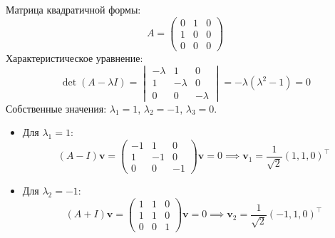\documentclass[a4paper]{article}
\begin{document}
\begin{enumerate}
\begin{enumerate}
    Матрица квадратичной формы:  
    \[
    A = \begin{pmatrix}
    0 & 1 & 0 \\
    1 & 0 & 0 \\
    0 & 0 & 0
    \end{pmatrix}
    \]  
    Характеристическое уравнение:  
    \[
    \det(A - \lambda I) = \begin{vmatrix}
    -\lambda & 1 & 0 \\
    1 & -\lambda & 0 \\
    0 & 0 & -\lambda
    \end{vmatrix} = -\lambda(\lambda^2 - 1) = 0
    \]  
    Собственные значения: \(\lambda_1 = 1\), \(\lambda_2 = -1\), \(\lambda_3 = 0\).  
    \begin{itemize}
      \item Для \(\lambda_1 = 1\):  
      \[
      (A - I)\mathbf{v} = \begin{pmatrix}
      -1 & 1 & 0 \\
      1 & -1 & 0 \\
      0 & 0 & -1
      \end{pmatrix} \mathbf{v} = 0 \implies \mathbf{v}_1 = \frac{1}{\sqrt{2}} (1, 1, 0)^\top
      \]  

      \item Для \(\lambda_2 = -1\):  
      \[
      (A + I)\mathbf{v} = \begin{pmatrix}
      1 & 1 & 0 \\
      1 & 1 & 0 \\
      0 & 0 & 1
      \end{pmatrix} \mathbf{v} = 0 \implies \mathbf{v}_2 = \frac{1}{\sqrt{2}} (-1, 1, 0)^\top
      \]  


\end{itemize}
\end{enumerate}
\end{enumerate}
\end{document}
